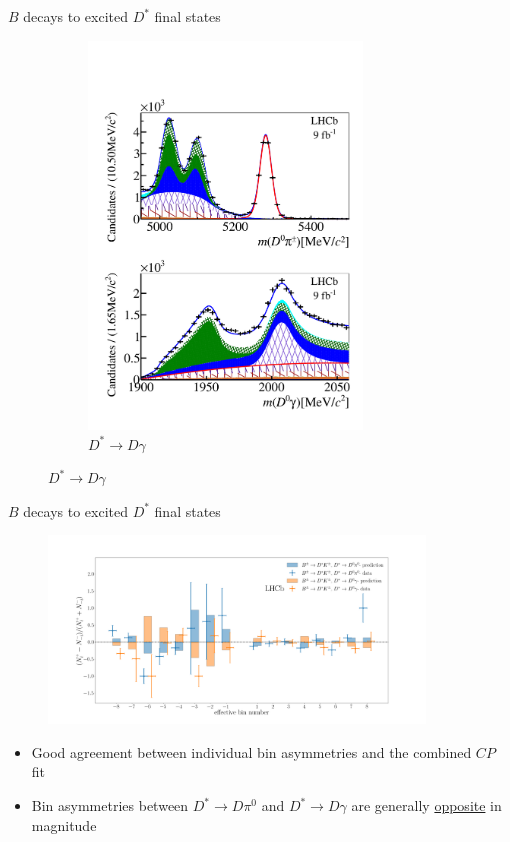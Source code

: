 \documentclass[xcolor={dvipsnames}]{beamer}
\begin{document}
\begin{frame}{$B$ decays to excited $D^*$ final states}
\begin{figure}
\begin{subfigure}{0.5\textwidth}
      \includegraphics[width = 0.8\textwidth]{Plots/massfitPage_canvas_gamma_d2kspipi_b2dpi_LL_merge_BtoDstpi.pdf}
      \caption{$D^*\to D\gamma$}
    \end{subfigure}
  \end{figure}
\end{frame}

\begin{frame}{$B$ decays to excited $D^*$ final states}
  \begin{figure}
    \includegraphics[height = 5.0cm]{Plots/histCPVnewd2kspipib2dk_BtoDstK.png}
  \end{figure}
  \vspace{-0.5cm}
  \begin{itemize}
    \setlength\itemsep{0.5em}
    \item{Good agreement between individual bin asymmetries and the combined $C\!P$ fit}
    \item{Bin asymmetries between $D^*\to D\pi^0$ and $D^*\to D\gamma$ are generally \underline{opposite} in magnitude}
  \end{itemize}
\end{frame}
\end{document}
